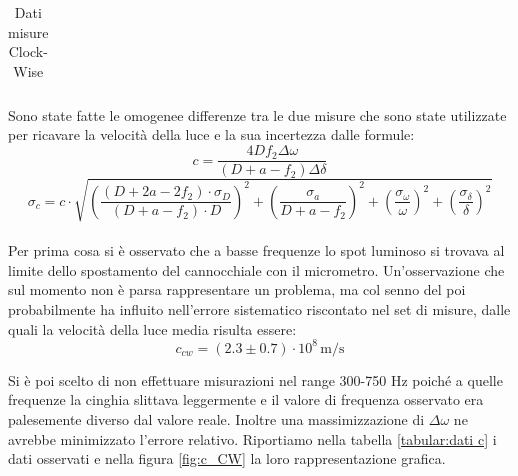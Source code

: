 \documentclass{article}
\begin{document}
\begin{table}[H]
\begin{tabular}{c c c c c c c c}
                    \bottomrule           
                
                \end{tabular}

                \caption{Dati misure Clock-Wise}
                \label{tabular:rawdataCW}

            \end{table}
            
            Sono state fatte le omogenee differenze tra le due misure che sono state utilizzate per ricavare la velocità della luce e la sua incertezza
            dalle formule:  
            \[ c= \frac{4Df_2\Delta\omega}{(D+a-f_2)\Delta\delta} \]
            \[ \sigma_c = c \cdot \sqrt{(\frac{(D + 2a - 2f_2) \cdot \sigma_D}{(D + a - f_2) \cdot D})^2 + 
                        (\frac{\sigma_a}{D + a - f_2})^2 + (\frac{\sigma_\omega}{\omega})^2 + (\frac{\sigma_\delta}{\delta})^2}
            \label{propagazione err luce} \] \\
            
            Per prima cosa si è osservato che a basse frequenze lo spot luminoso si trovava al limite dello spostamento del cannocchiale con il micrometro. 
            Un'osservazione che sul momento non è parsa rappresentare un problema, ma col senno del poi probabilmente ha influito 
            nell'errore sistematico riscontato nel set di misure, dalle quali la velocità della luce media risulta essere:    
            \[ c_{cw} = (2.3 \pm 0.7)\cdot10^8 \, \mathrm{m/s} \] 

            Si è poi scelto di non effettuare misurazioni nel range 300-750 Hz poiché a quelle frequenze la cinghia slittava leggermente e 
            il valore di frequenza osservato era palesemente diverso dal valore reale. 
            Inoltre una massimizzazione di $\Delta \omega$ ne avrebbe minimizzato l'errore relativo.
            Riportiamo nella tabella \ref{tabular:dati c} i dati osservati e nella figura \ref{fig:c_CW} la loro rappresentazione grafica.
        
\end{document}
